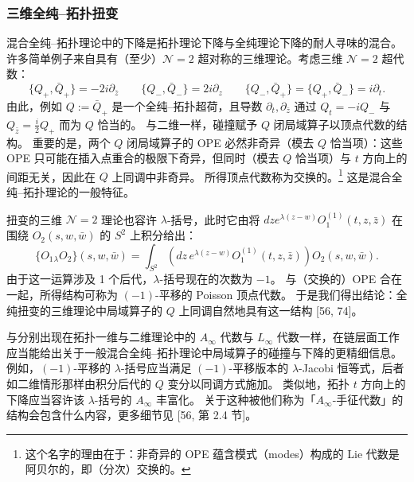 \subsubsection{三维全纯–拓扑扭变}

混合全纯–拓扑理论中的下降是拓扑理论下降与全纯理论下降的耐人寻味的混合。
许多简单例子来自具有（至少）$\mathcal{N}=2$ 超对称的三维理论。考虑三维 $\mathcal{N}=2$ 超代数：
\begin{equation}\tag{3.75}
\{Q_+,\bar Q_+\}=-2i\partial_{\bar z} \qquad \{Q_-,\bar Q_-\}=2i\partial_z \qquad \{Q_-,\bar Q_+\}=\{Q_+,\bar Q_-\}=i\partial_t.
\end{equation}
由此，例如 $Q:=\bar Q_+$ 是一个全纯–拓扑超荷，且导数 $\partial_t,\partial_{\bar z}$ 通过 $Q_t=-iQ_-$ 与 $Q_{\bar z}=\frac{i}{2}Q_+$ 而为 $Q$ 恰当的。
与二维一样，碰撞赋予 $Q$ 闭局域算子以顶点代数的结构。
重要的是，两个 $Q$ 闭局域算子的 OPE 必然非奇异（模去 $Q$ 恰当项）：这些 OPE 只可能在插入点重合的极限下奇异，但同时（模去 $Q$ 恰当项）与 $t$ 方向上的间距无关，因此在 $Q$ 上同调中非奇异。
所得顶点代数称为交换的。\footnote{这个名字的理由在于：非奇异的 OPE 蕴含模式（modes）构成的 Lie 代数是阿贝尔的，即（分次）交换的。}
这是混合全纯–拓扑理论的一般特征。

扭变的三维 $\mathcal{N}=2$ 理论也容许 $\lambda$-括号，此时它由将 $dze^{\lambda(z-w)}O^{(1)}_1(t,z,\bar z)$ 在围绕 $O_2(s,w,\bar w)$ 的 $S^2$ 上积分给出：
\begin{equation}\tag{3.76}
\{O_1{}_\lambda O_2\}(s,w,\bar w)=\int_{S^2}(dz\,e^{\lambda(z-w)}O^{(1)}_1(t,z,\bar z))O_2(s,w,\bar w).
\end{equation}
由于这一运算涉及 1 个后代，$\lambda$-括号现在的次数为 $-1$。
与（交换的）OPE 合在一起，所得结构可称为 $(-1)$-平移的 Poisson 顶点代数。
于是我们得出结论：全纯扭变的三维理论中局域算子的 $Q$ 上同调自然地具有这一结构 [56, 74]。

与分别出现在拓扑一维与二维理论中的 $A_\infty$ 代数与 $L_\infty$ 代数一样，在链层面工作应当能给出关于一般混合全纯–拓扑理论中局域算子的碰撞与下降的更精细信息。
例如，$(-1)$-平移的 $\lambda$-括号应当满足 $(-1)$-平移版本的 $\lambda$-Jacobi 恒等式，后者如二维情形那样由积分后代的 $Q$ 变分以同调方式施加。
类似地，拓扑 $t$ 方向上的下降应当容许该 $\lambda$-括号的 $A_\infty$ 丰富化。
关于这种被他们称为「$A_\infty$-手征代数」的结构会包含什么内容，更多细节见 [56, 第 2.4 节]。


